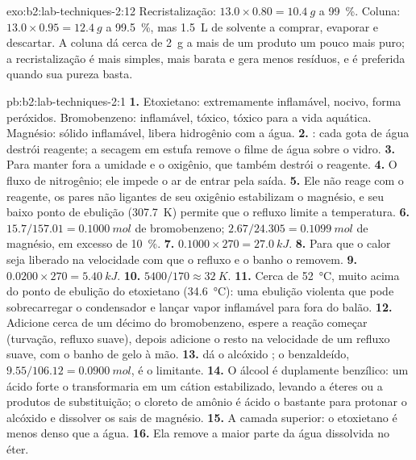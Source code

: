 \begin{solution}{exo:b2:lab-techniques-2:12}
Recristalização: $13.0 \times 0.80 = \qty{10.4}{g}$ a 99~\%. Coluna: $13.0 \times 0.95 =
\qty{12.4}{g}$ a 99.5~\%, mas \qty{1.5}{L} de solvente a comprar, evaporar e descartar. A coluna dá
cerca de \qty{2}{g} a mais de um produto um pouco mais puro; a recristalização é mais simples, mais
barata e gera menos resíduos, e é preferida quando sua pureza basta.
\end{solution}

\begin{solution}{pb:b2:lab-techniques-2:1}
\textbf{1.} Etoxietano: extremamente inflamável, nocivo, forma peróxidos. Bromobenzeno: inflamável,
tóxico, tóxico para a vida aquática. Magnésio: sólido inflamável, libera hidrogênio com a água.
\textbf{2.} : cada gota de água destrói reagente; a secagem em
estufa remove o filme de água sobre o vidro.
\textbf{3.} Para manter fora a umidade e o oxigênio, que também destrói o reagente.
\textbf{4.} O fluxo de nitrogênio; ele impede o ar de entrar pela saída.
\textbf{5.} Ele não reage com o reagente, os pares não ligantes de seu oxigênio estabilizam o magnésio, e
seu baixo ponto de ebulição (\qty{307.7}{K}) permite que o refluxo limite a temperatura.
\textbf{6.} $15.7/157.01 = \qty{0.1000}{mol}$ de bromobenzeno; $2.67/24.305 = \qty{0.1099}{mol}$ de magnésio,
em excesso de 10~\%.
\textbf{7.} $0.1000 \times 270 = \qty{27.0}{kJ}$.
\textbf{8.} Para que o calor seja liberado na velocidade com que o refluxo e o banho o removem.
\textbf{9.} $0.0200 \times 270 = \qty{5.40}{kJ}$.
\textbf{10.} $5400/170 \approx \qty{32}{K}$.
\textbf{11.} Cerca de \qty{52}{\degreeCelsius}, muito acima do ponto de ebulição do etoxietano
(\qty{34.6}{\degreeCelsius}): uma ebulição violenta que pode sobrecarregar o condensador e lançar vapor
inflamável para fora do balão.
\textbf{12.} Adicione cerca de um décimo do bromobenzeno, espere a reação começar (turvação, refluxo
suave), depois adicione o resto na velocidade de um refluxo suave, com o banho de gelo à mão.
\textbf{13.}  dá o alcóxido ; o benzaldeído,
$9.55/106.12 = \qty{0.0900}{mol}$, é o limitante.
\textbf{14.} O álcool é duplamente benzílico: um ácido forte o transformaria em um cátion estabilizado,
levando a éteres ou a produtos de substituição; o cloreto de amônio é ácido o bastante para protonar o
alcóxido e dissolver os sais de magnésio.
\textbf{15.} A camada superior: o etoxietano é menos denso que a água.
\textbf{16.} Ela remove a maior parte da água dissolvida no éter.

\end{solution}

